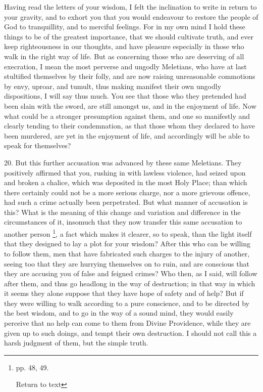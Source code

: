 Having read the letters of your wisdom, I felt
the inclination to write in return to your gravity, and to exhort you
that you would endeavour to restore the people of God to tranquillity, and to merciful feelings. For in my own mind I hold
these things to be of the greatest importance, that we should
cultivate truth, and ever keep righteousness in our thoughts, and have
pleasure especially in those who walk in the right way of life. But as
concerning those who are deserving of all execration, I mean the most
perverse and ungodly Meletians, who have at last stultified themselves
by their folly, and are now raising unreasonable commotions by envy,
uproar, and tumult, thus making manifest their own ungodly
dispositions, I will say thus much. You see that those who they
pretended had been slain with the sword, are still amongst us, and in
the enjoyment of life. Now what could be a stronger presumption
against them, and one so manifestly and clearly tending to their
condemnation, as that those whom they declared to have been murdered,
are yet in the enjoyment of life, and accordingly will be able to
speak for themselves?

20. But this further accusation was advanced by
these same Meletians. They positively affirmed that you, rushing in
with lawless violence, had seized upon and broken a chalice, which was
deposited in the most Holy Place; than which there certainly could not
be a more serious charge, nor a more grievous offence, had such a
crime actually been perpetrated. But what manner of accusation is
this? What is the meaning of this change and variation and difference
in the circumstances of it, insomuch that they now transfer this same
accusation to another person \footnote{pp. 48, 49.

Return to text}, a fact which makes it clearer, so to speak, than the light
itself that they designed to lay a plot for your wisdom? After this
who can be willing to follow them, men that have fabricated such
charges to the injury of another, seeing too that they are hurrying
themselves on to ruin, and are conscious that they are accusing you of
false and feigned crimes? Who then, as I said, will follow after them,
and thus go headlong in the way of destruction; in that way in which
it seems they alone suppose that they have hope of safety and of help?
But if they were willing to walk according to a pure conscience, and
to be directed by the best wisdom, and to go in the way of a sound
mind, they would easily perceive that no help can come to them from
Divine Providence, while they are given up to such doings, and
tempt their own destruction. I should not call this a harsh judgment
of them, but the simple truth.

